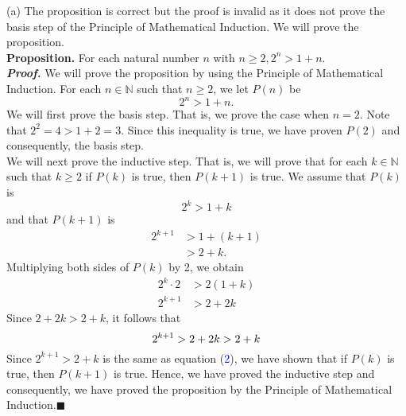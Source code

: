 \documentclass{article}
\begin{document}
(a) The proposition is correct but the proof is invalid as it does not prove the basis step of the Principle of Mathematical Induction. We will prove the proposition.\\
\textbf{Proposition.} For each natural number $n$ with $n \geq 2, 2^n > 1 + n.$\\
\textit{\textbf{Proof.}} We will prove the proposition by using the Principle of Mathematical Induction. For each $n \in \mathbb{N}$ such that $n \geq 2$, we let $P(n)$ be
\begin{equation*}
2^n > 1 + n.
\end{equation*}
We will first prove the basis step. That is, we prove the case when $n = 2.$ Note that $2^2 = 4 > 1 + 2 = 3.$ Since this inequality is true, we have proven $P(2)$ and consequently, the basis step.\\

We will next prove the inductive step. That is, we will prove that for each $k \in \mathbb{N}$ such that $k \geq 2$ if $P(k)$ is true, then $P(k + 1)$ is true. We assume that $P(k)$ is
\begin{equation}
2^k > 1 + k
\end{equation}
and that $P(k + 1)$ is
\begin{align}
2^{k + 1} &> 1 + (k + 1)\nonumber \\
&> 2 + k.
\end{align}
Multiplying both sides of $P(k)$ by 2, we obtain
\begin{align*}
2^k \cdot 2 &> 2(1 + k)\\
2^{k + 1} &> 2 + 2k
\end{align*}
Since $2 + 2k > 2 + k$, it follows that
\begin{equation*}
2^{k + 1} > 2 + 2k > 2 + k\\
\end{equation*}
Since $2^{k + 1} > 2 + k$ is the same as equation (\textcolor{blue}{2}), we have shown that if $P(k)$ is true, then $P(k + 1)$ is true. Hence, we have proved the inductive step and consequently, we have proved the proposition by the Principle of Mathematical Induction.\hfill$\blacksquare$ \\
\end{document}

